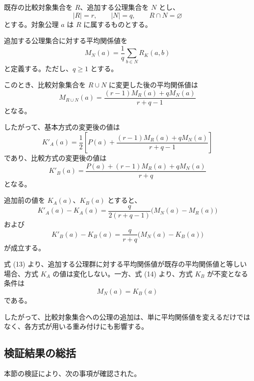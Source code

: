 \documentclass[a4paper,11pt]{ltjsarticle}
\begin{document}
既存の比較対象集合を $R$、追加する公理集合を $N$ とし、
\[
|R|=r,\qquad |N|=q,\qquad R\cap N=\varnothing
\]
とする。対象公理 $a$ は $R$ に属するものとする。

追加する公理集合に対する平均関係値を
\[
M_N(a)=\frac1q\sum_{b\in N}R_K(a,b)
\]
と定義する。ただし、$q\geq1$ とする。

このとき、比較対象集合を $R\cup N$ に変更した後の平均関係値は
\[
\boxed{
M_{R\cup N}(a)=
\frac{(r-1)M_R(a)+qM_N(a)}{r+q-1}
}
\tag{10}
\]
となる。

したがって、基本方式の変更後の値は
\[
\boxed{
K'_A(a)=
\frac12\left[
P(a)+
\frac{(r-1)M_R(a)+qM_N(a)}{r+q-1}
\right]
}
\tag{11}
\]
であり、比較方式の変更後の値は
\[
\boxed{
K'_B(a)=
\frac{
P(a)+(r-1)M_R(a)+qM_N(a)
}{r+q}
}
\tag{12}
\]
となる。

追加前の値を $K_A(a)$、$K_B(a)$ とすると、
\[
\boxed{
K'_A(a)-K_A(a)=
\frac{q}{2(r+q-1)}
\bigl(M_N(a)-M_R(a)\bigr)
}
\tag{13}
\]
および
\[
\boxed{
K'_B(a)-K_B(a)=
\frac{q}{r+q}
\bigl(M_N(a)-K_B(a)\bigr)
}
\tag{14}
\]
が成立する。

式 (13) より、追加する公理群に対する平均関係値が既存の平均関係値と等しい場合、方式 $K_A$ の値は変化しない。一方、式 (14) より、方式 $K_B$ が不変となる条件は
\[
M_N(a)=K_B(a)
\]
である。

したがって、比較対象集合への公理の追加は、単に平均関係値を変えるだけではなく、各方式が用いる重み付けにも影響する。

\subsection{検証結果の総括}

本節の検証により、次の事項が確認された。
\end{document}

